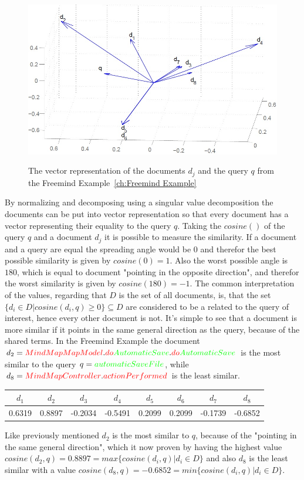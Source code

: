 \begin{figure}
  \centering
  \includegraphics[width=\linewidth]{src/pic/lsf-vectors}
  \label{lsf_vectors}
  \caption{The vector representation of the documents $d_j$ and the query $q$ from the Freemind Example~\ref{ch:Freemind Example}}
\end{figure}
By normalizing and decomposing using a singular value decomposition the documents can be put into vector representation so that every document has a vector representing their equality to the query $q$. Taking the $cosine()$ of the query $q$ and a document $d_j$ it is possible to measure the similarity. If a document and a query are equal the spreading angle would be $0$ and therefor the best possible similarity is given by $cosine(0)=1$. Also the worst possible angle is $180$, which is equal to document "pointing in the opposite direction", and therefor the worst similarity is given by $cosine(180)=-1$. The common interpretation of the values, regarding that $D$ is the set of all documents, is, that the set $\{d_i \in D| cosine(d_i,q) \ge 0 \} \subseteq D$ are considered to be a related to the query of interest, hence every other document is not. It's simple to see that a document is more similar if it points in the same general direction as the query, because of the shared terms. In the Freemind Example the document $d_2=\color{red}MindMapMapModel\color{black}.\color{red}do\color{green}AutomaticSave\color{black}.\color{red}do\color{green}AutomaticSave\color{black}$ is the most similar to the query $q=\color{green}automaticSaveFile\color{black}$, while $d_8=\color{red}MindMapController\color{black}.\color{red}actionPerformed\color{black}$ is the least similar.
\begin{center}
  \begin{tabular}{ c c c c c c c c }
    \hline
    $d_1$ & $d_2$ & $d_3$ & $d_4$ & $d_5$ & $d_6$ & $d_7$ & $d_8$ \\ \hline
    0.6319 & 0.8897 & -0.2034 & -0.5491 & 0.2099 & 0.2099 & -0.1739 & -0.6852 \\ \hline
  \end{tabular}
\end{center}
Like previously mentioned $d_2$ is the most similar to $q$, because of the "pointing in the same general direction", which it now proven by having the highest value $cosine(d_2,q)=0.8897=max \{ cosine(d_i,q) | d_i \in D \} $ and also $d_8$ is the least similar with a value $cosine(d_8,q)=-0.6852=min\{cosine(d_i,q) | d_i \in D\}$.
  

